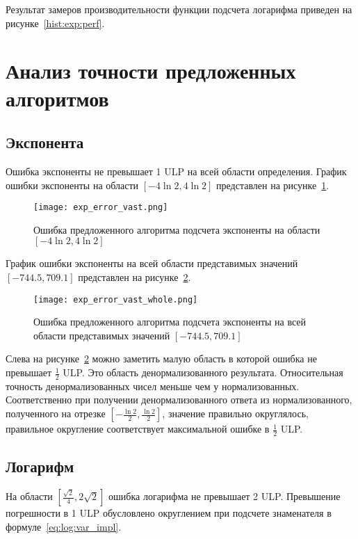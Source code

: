 Результат замеров производительности функции подсчета логарифма приведен на рисунке~\ref{hist:exp:perf}.

\section{Анализ точности предложенных алгоритмов}

\subsection{Экспонента}

Ошибка экспоненты не превышает 1 ULP на всей области определения.
График ошибки экспоненты на области $[-4\ln{2}, 4\ln{2}]$ представлен на рисунке~\ref{plot:exp:small}.

\begin{figure}[hbt]
    \centering
    \texttt{[image: exp\_error\_vast.png]}
    \caption{Ошибка предложенного алгоритма подсчета экспоненты на области $[-4\ln{2}, 4\ln{2}]$}
    \label{plot:exp:small}
\end{figure}

График ошибки экспоненты на всей области представимых значений \newline $[-744.5, 709.1]$ представлен на рисунке~\ref{plot:exp:whole}.

\begin{figure}[hbt]
    \centering
    \texttt{[image: exp\_error\_vast\_whole.png]}
    \caption{Ошибка предложенного алгоритма подсчета экспоненты на всей области представимых значений $[-744.5, 709.1]$}
    \label{plot:exp:whole}
\end{figure}

Слева на рисунке~\ref{plot:exp:whole} можно заметить малую область в которой ошибка не превышает $\frac{1}{2}$ ULP.
Это область денормализованного результата.
Относительная точность денормализованных чисел меньше чем у нормализованных.
Соответственно при получении денормализованного ответа из нормализованного, полученного на отрезке $[-\frac{\ln{2}}{2}, \frac{\ln{2}}{2}]$, значение правильно округлялось, правильное округление соответствует максимальной ошибке в $\frac{1}{2}$ ULP.

\subsection{Логарифм}

На области $[\frac{\sqrt{2}}{4}, 2\sqrt{2}]$ ошибка логарифма не превышает 2 ULP.
Превышение погрешности в 1 ULP обусловлено округлением при подсчете знаменателя в формуле~\ref{eq:log:var_impl}.

